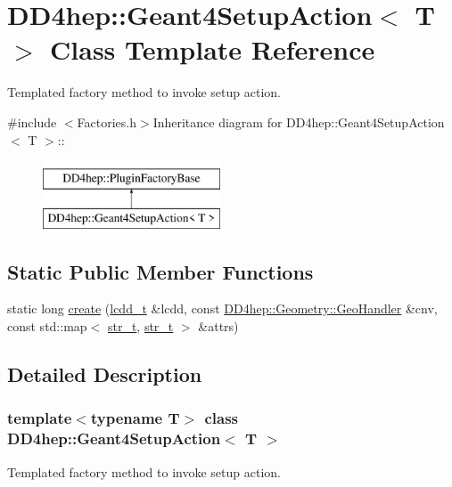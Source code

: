 \hypertarget{class_d_d4hep_1_1_geant4_setup_action}{
\section{DD4hep::Geant4SetupAction$<$ T $>$ Class Template Reference}
\label{class_d_d4hep_1_1_geant4_setup_action}
}


Templated factory method to invoke setup action.  


{\ttfamily \#include $<$Factories.h$>$}Inheritance diagram for DD4hep::Geant4SetupAction$<$ T $>$::\begin{figure}[H]
\begin{center}
\leavevmode
\includegraphics[height=2cm]{class_d_d4hep_1_1_geant4_setup_action}
\end{center}
\end{figure}
\subsection*{Static Public Member Functions}
\begin{DoxyCompactItemize}
\item 
static long \hyperlink{class_d_d4hep_1_1_geant4_setup_action_a361e27050900a95f90d6cf8a199a0820}{create} (\hyperlink{class_d_d4hep_1_1_geometry_1_1_l_c_d_d}{lcdd\_\-t} \&lcdd, const \hyperlink{class_d_d4hep_1_1_geometry_1_1_geo_handler}{DD4hep::Geometry::GeoHandler} \&cnv, const std::map$<$ \hyperlink{struct_d_d4hep_1_1_plugin_factory_base_aaa4c6d8801f70db2776c5473abc92692}{str\_\-t}, \hyperlink{struct_d_d4hep_1_1_plugin_factory_base_aaa4c6d8801f70db2776c5473abc92692}{str\_\-t} $>$ \&attrs)
\end{DoxyCompactItemize}


\subsection{Detailed Description}
\subsubsection*{template$<$typename T$>$ class DD4hep::Geant4SetupAction$<$ T $>$}

Templated factory method to invoke setup action. 


